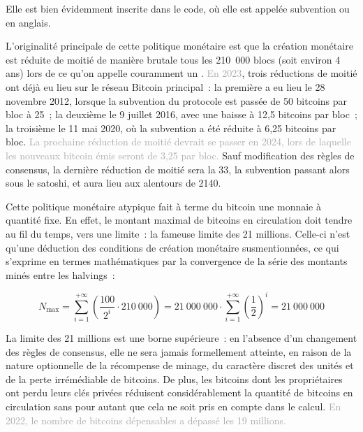 Elle est bien évidemment inscrite dans le code, où elle est appelée subvention ou  en anglais.

L'originalité principale de cette politique monétaire est que la création monétaire est réduite de moitié de manière brutale tous les 210~000 blocs (soit environ 4 ans) lors de ce qu'on appelle couramment un . \textcolor{darkgray}{En 2023}, trois réductions de moitié ont déjà eu lieu sur le réseau Bitcoin principal~: la première a eu lieu le 28 novembre 2012, lorsque la subvention du protocole est passée de 50 bitcoins par bloc à 25~; la deuxième le 9 juillet 2016, avec une baisse à 12,5 bitcoins par bloc~; la troisième le 11 mai 2020, où la subvention a été réduite à 6,25 bitcoins par bloc. \textcolor{darkgray}{La prochaine réduction de moitié devrait se passer en 2024, lors de laquelle les nouveaux bitcoin émis seront de 3,25 par bloc.} Sauf modification des règles de consensus, la dernière réduction de moitié sera la 33\ieme{}, la subvention passant alors sous le satoshi, et aura lieu aux alentours de 2140.

%
% 
% 


Cette politique monétaire atypique fait à terme du bitcoin une monnaie à quantité fixe. En effet, le montant maximal de bitcoins en circulation doit tendre au fil du temps, vers une limite~: la fameuse limite des 21 millions. Celle-ci n'est qu'une déduction des conditions de création monétaire susmentionnées, ce qui s'exprime en termes mathématiques par la convergence de la série des montants minés entre les halvings~:

\[
N_{\mathrm{max}} = \sum_{i=1}^{+\infty} \left( {\frac{100}{2^i} \cdot 210~000} \right) = 21~000~000 \cdot \sum_{i=1}^{+\infty} \left(\frac{1}{2}\right)^i = 21~000~000
\]

La limite des 21 millions est une borne supérieure~: en l'absence d'un changement des règles de consensus, elle ne sera jamais formellement atteinte, en raison de la nature optionnelle de la récompense de minage, du caractère discret des unités et de la perte irrémédiable de bitcoins. De plus, les bitcoins dont les propriétaires ont perdu leurs clés privées réduisent considérablement la quantité de bitcoins en circulation sans pour autant que cela ne soit pris en compte dans le calcul. \textcolor{darkgray}{En 2022, le nombre de bitcoins dépensables a dépassé les 19 millions.}


